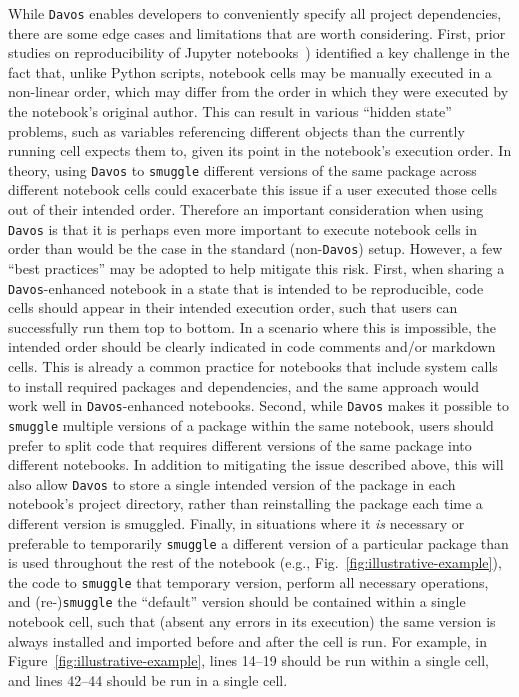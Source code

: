 \documentclass[preprint,12pt,a4paper]{elsarticle}
\begin{document}
While \texttt{Davos} enables developers to conveniently specify all project
dependencies, there are some edge cases and limitations that are worth
considering.
First, prior studies on reproducibility of Jupyter notebooks~\cite[e.g.,][]{PimeEtal19}) identified a key challenge in the fact that, unlike Python scripts, notebook cells may be manually executed in a non-linear order, which may differ from the order in which they were executed by the notebook's original author.
This can result in various ``hidden state'' problems, such as variables referencing different objects than the currently running cell expects them to, given its point in the notebook's execution order.
In theory, using \texttt{Davos} to \texttt{smuggle} different versions of the same package across different notebook cells could exacerbate this issue if a user executed those cells out of their intended order.
Therefore an important consideration when using \texttt{Davos} is that it is perhaps even more important to execute notebook cells in order than would be the case in the standard (non-\texttt{Davos}) setup.
However, a few ``best practices'' may be adopted to help mitigate this risk.
First, when sharing a \texttt{Davos}-enhanced notebook in a state that is intended to be reproducible, code cells should appear in their intended execution order, such that users can successfully run them top to bottom.
In a scenario where this is impossible, the intended order should be clearly indicated in code comments and/or markdown cells.
This is already a common practice for notebooks that include system calls to install required packages and dependencies, and the same approach would work well in \texttt{Davos}-enhanced notebooks.
Second, while \texttt{Davos} makes it possible to \texttt{smuggle} multiple versions of a package within the same notebook, users should prefer to split code that requires different versions of the same package into different notebooks.
In addition to mitigating the issue described above, this will also allow \texttt{Davos} to store a single intended version of the package in each notebook's project directory, rather than reinstalling the package each time a different version is smuggled.
Finally, in situations where it \textit{is} necessary or preferable to temporarily \texttt{smuggle} a different version of a particular package than is used throughout the rest of the notebook (e.g., Fig.~\ref{fig:illustrative-example}), the code to \texttt{smuggle} that temporary version, perform all necessary operations, and (re-)\texttt{smuggle} the ``default'' version should be contained within a single notebook cell, such that (absent any errors in its execution) the same version is always installed and imported before and after the cell is run.
For example, in Figure~\ref{fig:illustrative-example}, lines 14--19 should be run within a single cell, and lines 42--44 should be run in a single cell.
\end{document}
